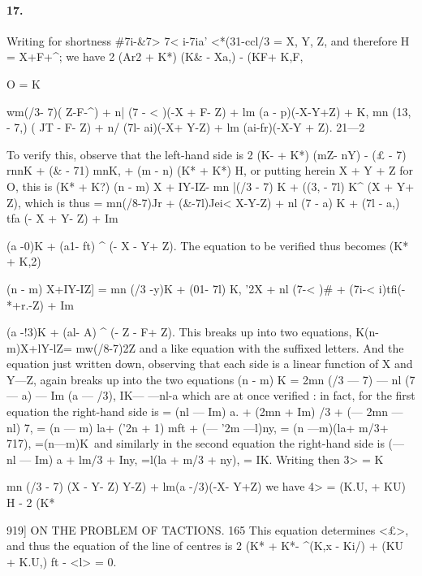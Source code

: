 \documentclass[11pt,a4paper]{book}
\begin{document}
{{{{{{{{{\paragraph{17.} Writing  for  shortness
\#7i-\&7>      7< i-7ia'     <*(31-ccl/3  =  X,   Y,  Z,
and  therefore  H  =  X+F+^;    we  have
2  (Ar2  +  K*)  (K\&  -  Xa,)  -  (KF+  K,F,}  O
=  K  {wm(/3-  7)(  Z-F-^)
+  n|  (7  -  < )(-X  +  F-  Z)
+  lm  (a  -  p)(-X-Y+Z)
+  K,  {mn  (13,  -  7,)  (  JT  -  F-  Z)
+  n/  (7l-  ai)(-X+  Y-Z)
+  lm  (ai-fr)(-X-Y  +  Z)}.
21---2


To  verify  this,  observe  that  the  left-hand  side  is
2  (K-  +  K*)  (mZ-  nY)  -  {(£  -  7)  rnnK  +  (\&  -  71)  mnK,  +  (m  -  n)  (K*  +  K*)  H},
or  putting  herein  X  +  Y  +  Z  for  O,  this  is
(K*  +  K?)  {(n  -  m)  X  +  IY-IZ}-  mn  |(/3  -  7)  K  +  ((3,  -  7l)  K^  (X  +  Y+  Z),
which  is  thus
=     mn{(/8-7)Jr  +  (\&-7l)Jei}<    X-Y-Z)
+  nl  {(7  -  a)  K  +  (7l  -  a,)  tfa}  (-  X  +  Y-  Z)
+  Im  {(a  -0)K  +  (a1-  ft)  ^  (-  X  -  Y+  Z).
The  equation  to  be  verified  thus  becomes
(K*  +  K,2)  {(n  -  m)  X+IY-IZ]
=     mn  {(/3  -y)K  +  (01-  7l)  K,}  '2X
+  nl  {(7-< )\#  +  (7i-< i)tfi}(-*+r.-Z)
+  Im  {(a  -!3)K  +  (al-  A)  ^  (-  Z  -  F+  Z).
This  breaks  up  into  two  equations,
K{(n-m)X+lY-lZ}=      mw(/8-7)2Z
and  a  like  equation  with  the  suffixed  letters.  And  the  equation  just  written  down,
observing  that  each  side  is  a  linear  function  of  X  and  Y---Z,  again  breaks  up  into
the  two  equations
(n  -  m)  K  =  2mn  (/3  ---  7)  ---  nl  (7  ---  a)  ---  Im  (a  ---  /3),
IK---  ---nl-a
which  are  at  once  verified  :   in  fact,  for  the  first  equation  the  right-hand  side  is
=  (nl  ---  Im)  a.  +  (2mn  +  Im)  /3  +  (---  2mn  ---  nl)  7,
=  (n  ---  m)  la+     ('2n  +  1)  mft  +  (---  '2m    ---l)ny,
=  (n  ---m)(la+  m/3+  717),  =(n---m)K\
and  similarly  in  the  second  equation  the  right-hand  side  is
(---  nl  ---  Im)  a  +  lm/3   +  Iny,     =l(la  +  m/3  +  ny),     =  IK.
Writing  then
3>  =      K  {mn  (/3  -  7)  (X  -  Y-  Z)
Y-Z)  +  lm(a  -/3)(-X-  Y+Z)
we  have
4>  =  (K.U,  +  KU)  H  -  2  (K*


919]  ON    THE    PROBLEM    OF    TACTIONS.  165
This  equation  determines  <£>,  and  thus  the  equation  of  the  line  of  centres  is
2  (K*  +  K*-  ^(K,x  -  Ki/)  +  (KU  +  K.U,)  ft  -  <l>  =  0.
}}}}}}}}}}}}}
\end{document}

